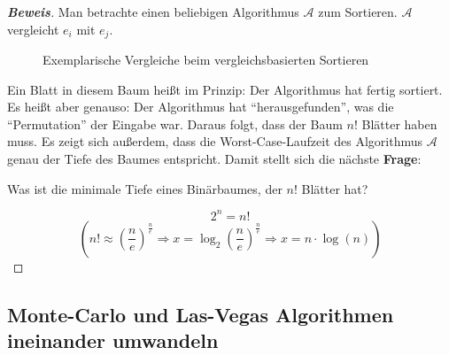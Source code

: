 \documentclass{scrartcl}%
\begin{document}
    \begin{proof}[\textbf{Beweis}]
        Man betrachte einen beliebigen Algorithmus $\mathcal{A}$ zum Sortieren. $\mathcal{A}$ vergleicht $e_i$ mit $e_j$.

        \begin{figure}[htb]
            \centering

            \caption{Exemplarische Vergleiche beim vergleichsbasierten Sortieren}
        \end{figure}

        Ein Blatt in diesem Baum heißt im Prinzip: Der Algorithmus hat fertig sortiert.
        Es heißt aber genauso: Der Algorithmus hat "`herausgefunden"', was die "`Permutation"' der Eingabe war.
        Daraus folgt, dass der Baum $n!$ Blätter haben muss.
        Es zeigt sich außerdem, dass die Worst-Case-Laufzeit des Algorithmus $\mathcal{A}$ genau der Tiefe des Baumes entspricht.
        Damit stellt sich die nächste \textbf{Frage}:

        Was ist die minimale Tiefe eines Binärbaumes, der $n!$ Blätter hat?

        \begin{equation*}
            2^n = n!
        \end{equation*}
        \begin{equation*}
            \left(n! \approx \left({\frac{n}{e}}\right)^{\frac{n}{e}} \Rightarrow x = \log_2\left(\frac{n}{e}\right)^{\frac{n}{e}}
            \Rightarrow x = n \cdot \log(n)\right)
        \end{equation*}

    \end{proof}

    \subsection*{Monte-Carlo und Las-Vegas Algorithmen ineinander umwandeln}
    \label{subsec:monte-carloUndLas-vegasAlgorithmenIneinanderUmwandeln}
\end{document}
